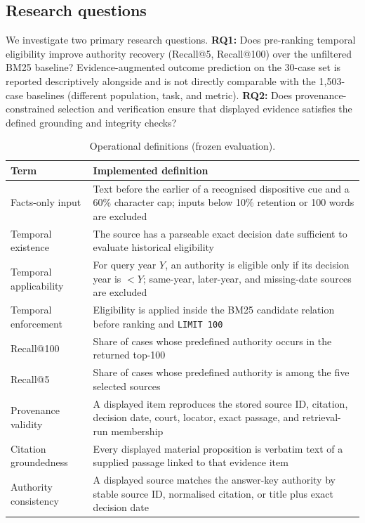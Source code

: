 \documentclass[conference]{IEEEtran}
\begin{document}
\subsection{Research questions}

We investigate two primary research questions. \textbf{RQ1:} Does pre-ranking temporal eligibility improve authority recovery (Recall@5, Recall@100) over the unfiltered BM25 baseline? Evidence-augmented outcome prediction on the 30-case set is reported descriptively alongside and is not directly comparable with the 1{,}503-case baselines (different population, task, and metric). \textbf{RQ2:} Does provenance-constrained selection and verification ensure that displayed evidence satisfies the defined grounding and integrity checks?


\begin{table}[t]
\caption{Operational definitions (frozen evaluation).}
\label{tab:defs}
\centering
\footnotesize
\begin{tabular}{p{2.35cm}p{5.5cm}}
\toprule
\textbf{Term} & \textbf{Implemented definition} \\
\midrule
Facts-only input &
Text before the earlier of a recognised dispositive cue and a 60\%
character cap; inputs below 10\% retention or
100 words are excluded \\
\addlinespace
Temporal existence &
The source has a parseable exact decision date sufficient to evaluate historical eligibility \\
\addlinespace
Temporal applicability &
For query year $Y$, an authority is eligible only if its decision year is
$< Y$; same-year, later-year, and missing-date sources are excluded \\
\addlinespace
Temporal enforcement &
Eligibility is applied inside the BM25 candidate relation before
ranking and \texttt{LIMIT 100} \\
\addlinespace
Recall@100 &
Share of cases whose predefined authority occurs in the
returned top-100 \\
\addlinespace
Recall@5 &
Share of cases whose predefined authority is among the five selected
sources \\
\addlinespace
Provenance validity &
A displayed item reproduces the stored source ID, citation, decision date,
court, locator, exact passage, and retrieval-run membership \\
\addlinespace
Citation groundedness &
Every displayed material proposition is verbatim text of a supplied passage
linked to that evidence item \\
\addlinespace
Authority consistency &
A displayed source matches the answer-key authority by stable source
ID, normalised citation, or title plus exact decision date \\
\bottomrule
\end{tabular}
\end{table}
\end{document}
